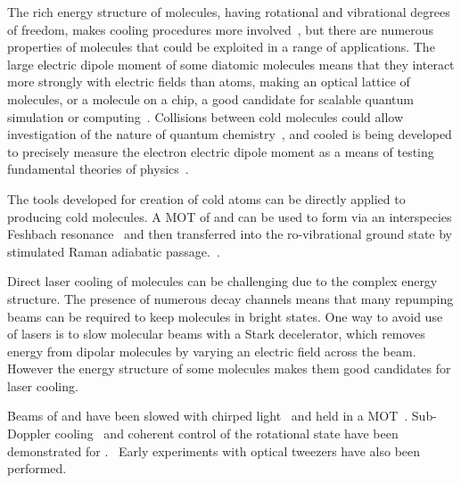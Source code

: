 The rich energy structure of molecules, having rotational and vibrational
degrees of freedom, makes cooling procedures more involved~\cite{Tarbutt2018,
1367-2630-17-1-015007}, but there are numerous properties of molecules that
could be exploited in a range of applications. The large electric dipole moment
of some diatomic molecules means that they interact more strongly with electric
fields than atoms, making an optical lattice of molecules, or a molecule on a
chip, a good candidate for scalable quantum simulation or
computing~\cite{Micheli2006, Andre2006}.  Collisions between cold molecules
could allow investigation of the nature of quantum chemistry~\cite{Krems2008},
and cooled \YbF{} is being developed to precisely measure the electron electric
dipole moment as a means of testing fundamental theories of
physics~\cite{Lim2018}.

The tools developed for creation of cold atoms can be directly applied to
producing cold molecules. A MOT of \esRb{} and \ottCs{} can be used to form
\RbCs{} via an interspecies Feshbach resonance~\cite{PhysRevA.85.032506,
PhysRevA.89.033604} and then transferred into the ro-vibrational ground state by
stimulated Raman adiabatic passage.~\cite{PhysRevLett.113.255301,
RevModPhys.70.1003}.

Direct laser cooling of molecules can be challenging due to the complex energy
structure. The presence of numerous decay channels means that many repumping
beams can be required to keep molecules in bright states. One way to avoid use
of lasers is to slow molecular beams with a Stark decelerator, which removes
energy from dipolar molecules by varying an electric field across the
beam.~\cite{Bethlem1999} However the energy structure of some molecules makes
them good candidates for laser cooling.~\cite{Shuman2010,}

 Beams of \SrF{} and \CaF{} have
been slowed with chirped light~\cite{PhysRevLett.108.103002, Truppe2017a} and
held in a MOT~\cite{Barry2014, Williams2017}. Sub-Doppler
cooling~\cite{Truppe2017} and coherent control of the rotational state have been
demonstrated for \CaF{}.~\cite{Williams2018, Blackmore_2018}  Early experiments with optical tweezers have also been
performed.~\cite{Anderegg2019}


